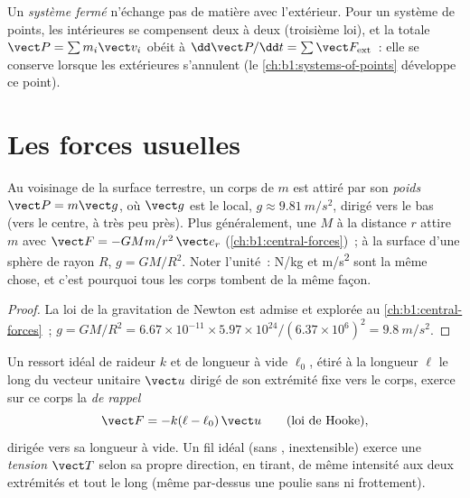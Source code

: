 \begin{definition}\label{def:b1:newton-dynamics:conservation}
Un \emph{système fermé} n'échange pas de matière avec l'extérieur. Pour
un système de points, les  intérieures se compensent deux à deux
(troisième loi), et la  totale
$\vect P = \sum m_i\vect v_i$ obéit à
$\dd\vect P/\dd t = \sum\vect F_{\mathrm{ext}}$~: elle se conserve
lorsque les  extérieures s'annulent (le
\cref{ch:b1:systems-of-points} développe ce point).
\end{definition}

\section{Les forces usuelles}

\begin{proposition}\label{prop:b1:newton-dynamics:weight}
Au voisinage de la surface terrestre, un corps de  $m$ est attiré
par son \emph{poids} $\vect P = m\vect g$, où $\vect g$ est le  local, $g \approx \qty{9.81}{m/s^2}$, dirigé vers le bas (vers
le centre, à très peu près). Plus généralement, une  $M$ à la
distance $r$ attire $m$ avec $\vect F = -GMm/r^2\,\vect e_r$
(\cref{ch:b1:central-forces})~; à la surface d'une sphère de rayon $R$,
$g = GM/R^2$. Noter l'unité~: \unit{N/kg} et \unit{m/s^2} sont la même
chose, et c'est pourquoi tous les corps tombent de la même façon.
\end{proposition}

\begin{proof}
La loi de la gravitation de Newton est admise et explorée au
\cref{ch:b1:central-forces}~; $g = GM/R^2 = 6.67\times10^{-11} \times
5.97\times10^{24}/(6.37\times10^6)^2 = \qty{9.8}{m/s^2}$.
\end{proof}

\begin{proposition}\label{prop:b1:newton-dynamics:springstring}
Un ressort idéal de raideur $k$ et de longueur à vide $\ell_0$, étiré à
la longueur $\ell$ le long du vecteur unitaire $\vect u$ dirigé de son
extrémité fixe vers le corps, exerce sur ce corps la \emph{ de
rappel}
\[
\vect F = -k(\ell - \ell_0)\,\vect u \qquad (\text{loi de Hooke}),
\]
dirigée vers sa longueur à vide. Un fil idéal (sans ,
inextensible) exerce une \emph{tension} $\vect T$ selon sa propre
direction, en tirant, de même intensité aux deux extrémités et tout le
long (même par-dessus une poulie sans  ni frottement).
\end{proposition}

